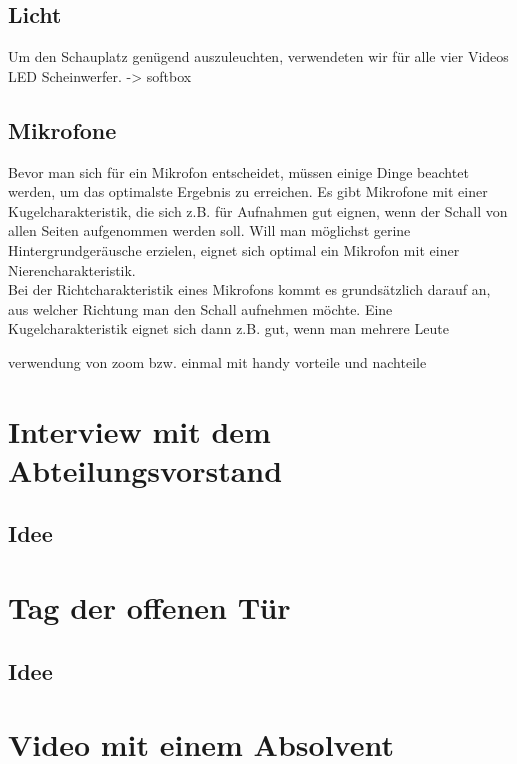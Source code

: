 \subsection{Licht}
Um den Schauplatz genügend auszuleuchten, verwendeten wir für alle vier Videos LED Scheinwerfer. -> softbox 

\subsection{Mikrofone}
Bevor man sich für ein Mikrofon entscheidet, müssen einige Dinge beachtet werden, um das optimalste Ergebnis zu erreichen. Es gibt Mikrofone mit einer Kugelcharakteristik, die sich z.B. für Aufnahmen gut eignen, wenn der Schall von allen Seiten aufgenommen werden soll. Will man möglichst gerine Hintergrundgeräusche erzielen, eignet sich optimal ein Mikrofon mit einer Nierencharakteristik. \\
Bei der Richtcharakteristik eines Mikrofons kommt es grundsätzlich darauf an, aus welcher Richtung man den Schall aufnehmen möchte. Eine Kugelcharakteristik eignet sich dann z.B. gut, wenn man mehrere Leute


verwendung von zoom bzw. einmal mit handy vorteile und nachteile 

\section{Interview mit dem Abteilungsvorstand}
\renewcommand{\kapitelautor}{Autor: Kerstin Schön}
\subsection{Idee}
\renewcommand{\kapitelautor}{Autor: Kerstin Schön}
\section{Tag der offenen Tür}
\renewcommand{\kapitelautor}{Autor: Kerstin Schön}
\subsection{Idee}
\renewcommand{\kapitelautor}{Autor: Kerstin Schön}
\section{Video mit einem Absolvent}
\renewcommand{\kapitelautor}{Autor: Kerstin Schön}

